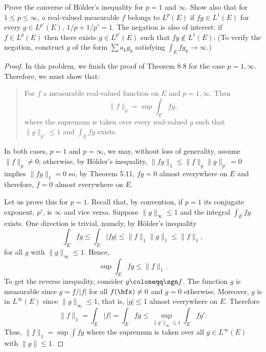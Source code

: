 
\begin{problem}
Prove the converse of Hölder's inequality for $p=1$ and $\infty$. Show also
that for $1\leq p\leq\infty$, a real-valued measurable $f$ belongs to
$L^p(E)$ if $fg\in L^1(E)$ for every $g\in L^{p'}(E)$, $1/p+1/p'=1$. The
negation is also of interest: if $f\in L^p(E)$ then there exists $g\in
L^{p'}(E)$ such that $fg\notin L^1(E)$. (To verify the negation, construct
$g$ of the form $\sum a_kg_k$ satisfying $\int_E fg_k\to\infty$.)
\end{problem}
\begin{proof}
In this problem, we finish the proof of Theorem 8.8 for the case
$p=1,\infty$. Therefore, we must show that:
\begin{quote}
For $f$ a measurable real-valued function on $E$ and $p=1,\infty$. Then
\[
\|f\|_p=\sup\int_E fg,
\]
where the supremum is taken over every real-valued $g$ such that
$\|g\|_{p'}\leq 1$ and $\int_E fg$ exists.
\end{quote}
In both cases, $p=1$ and $p=\infty$, we may, without loss of generality,
assume $\|f\|_p\neq 0$; otherwise, by Hölder's inequality, $\|fg\|_1\leq
\|f\|_p\|g\|_{p'}=0$ implies $\|fg\|_1=0$ so, by Theorem 5.11, $fg=0$
almost everywhere on $E$ and therefore, $f=0$ almost everywhere on $E$.

Let us prove this for $p=1$. Recall that, by convention, if $p=1$ its
conjugate exponent, $p'$, is $\infty$ and vice versa. Suppose
$\|g\|_\infty\leq 1$ and the integral $\int_E fg$ exists. One direction is
trivial, namely, by Hölder's inequality
\begin{equation}
\label{eq:1:holders-application}
\int_E fg\leq \int_E |fg|\leq\|f\|_1\|g\|_1\leq \|f\|_1,
\end{equation}
for all $g$ with $\|g\|_\infty\leq 1$. Hence,
\[
\sup\int_E fg\leq\|f\|_1.
\]
To get the reverse inequality, consider $g\coloneqq\sgn f$. The function
$g$ is measurable since $g=f/|f|$ for all $f(\bfx)\neq 0$ and $g=0$
otherwise. Moreover, $g$ is in $L^\infty(E)$ since $\|g\|_\infty\leq 1$,
that is, $|g|\leq 1$ almost everywhere on $E$. Therefore
\begin{equation}
  \label{eq:1:reverse-ineq}
\|f\|_1=\int_E |f|=\int_E fg\leq\sup_{\|g'\|_\infty\leq 1}\int_E fg'.
\end{equation}
Thus, $\|f\|_1=\sup\int fg$ where the supremum is taken over all $g\in
L^\infty(E)$ with $\|g\|\leq 1$.


\end{proof}
